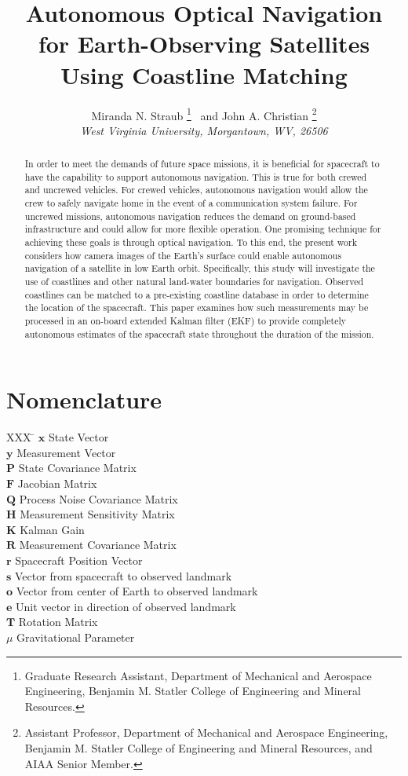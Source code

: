 \documentclass[]{aiaa-tc}%
\title{Autonomous Optical Navigation for Earth-Observing Satellites Using Coastline Matching}
\author{
  Miranda N. Straub%
    \thanks{Graduate Research Assistant, Department of Mechanical and Aerospace Engineering, Benjamin M. Statler College of Engineering and Mineral Resources.}
  \ and John A. Christian%
	\thanks{Assistant Professor, Department of Mechanical and Aerospace Engineering, Benjamin M. Statler College of Engineering and Mineral Resources, and AIAA Senior Member.}\\
  {\normalsize\itshape
  West Virginia University, Morgantown, WV, 26506}
 }
\begin{document}
\maketitle

\begin{abstract}
In order to meet the demands of future space missions, it is beneficial for spacecraft to have the capability to support autonomous navigation. This is true for both crewed and uncrewed vehicles. For crewed vehicles, autonomous navigation would allow the crew to safely navigate home in the event of a communication system failure. For uncrewed missions, autonomous navigation reduces the demand on ground-based infrastructure and could allow for more flexible operation. One promising technique for achieving these goals is through optical navigation. To this end, the present work considers how camera images of the Earth's surface could enable autonomous navigation of a satellite in low Earth orbit. Specifically, this study will investigate the use of coastlines and other natural land-water boundaries for navigation. Observed coastlines can be matched to a pre-existing coastline database in order to determine the location of the spacecraft. This paper examines how such measurements may be processed in an on-board extended Kalman filter (EKF) to provide completely autonomous estimates of the spacecraft state throughout the duration of the mission.
\end{abstract}

\section*{Nomenclature}

\begin{tabbing}
  XXX \= \kill%
  $\textbf{x}$ \> State Vector \\
  $\textbf{y}$ \> Measurement Vector \\
  $\textbf{P}$ \> State Covariance Matrix \\
  $\textbf{F}$ \> Jacobian Matrix \\
  $\textbf{Q}$ \> Process Noise Covariance Matrix \\
  $\textbf{H}$ \> Measurement Sensitivity Matrix \\
  $\textbf{K}$ \> Kalman Gain \\
  $\textbf{R}$ \> Measurement Covariance Matrix \\
  $\textbf{r}$ \> Spacecraft Position Vector \\
  $\textbf{s}$ \> Vector from spacecraft to observed landmark \\
  $\textbf{o}$ \> Vector from center of Earth to observed landmark \\
  $\textbf{e}$ \> Unit vector in direction of observed landmark \\
  $\textbf{T}$ \> Rotation Matrix \\
  $\mu$ \> Gravitational Parameter \\ [5pt]
 \end{tabbing}
\end{document}
